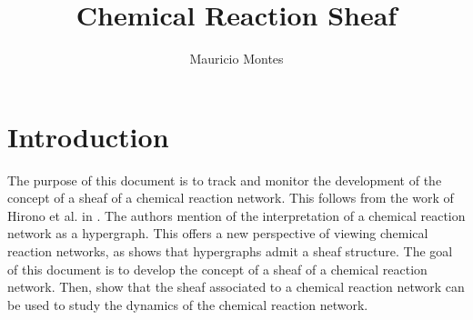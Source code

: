 \documentclass[12pt]{article}
\author{Mauricio Montes}
\title{Chemical Reaction Sheaf}
\theoremstyle{definition}
\newcommand{\<}{\langle}
\renewcommand{\>}{\rangle}
\begin{document}
\maketitle

\section{Introduction}

The purpose of this document is to track and monitor the development of the concept of
a sheaf of a chemical reaction network. This follows from the work of Hirono et al. in 
\cite{Hirono2021}. The authors mention of the interpretation of a chemical reaction network
as a hypergraph. This offers a new perspective of viewing chemical reaction networks, as 
\cite{duta2023sheaf} shows that hypergraphs admit a sheaf structure. The goal of this document
is to develop the concept of a sheaf of a chemical reaction network. Then, show that the 
sheaf associated to a chemical reaction network can be used to study the dynamics of the
chemical reaction network.

\begin{comment}

\section{Definitions}

\subsection{Topology}

\subsection{Simplicial Complexes}

\subsection{Simplicial Homology}

\subsection{Simplicial Cohomology}

\subsection{Chemical Reaction Network}

\end{comment}
\end{document}
